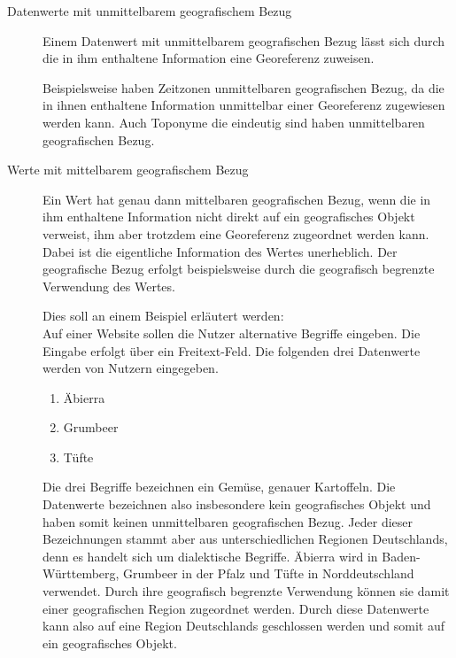 			\begin{description}
				\item[Datenwerte mit unmittelbarem geografischem Bezug]

					Einem Datenwert mit unmittelbarem geografischen Bezug lässt sich durch die in ihm enthaltene Information eine Georeferenz zuweisen.	

					Beispielsweise haben Zeitzonen unmittelbaren geografischen Bezug, da die in ihnen enthaltene Information unmittelbar einer Georeferenz zugewiesen werden kann.
					Auch Toponyme die eindeutig sind haben unmittelbaren geografischen Bezug.

				\item[Werte mit mittelbarem geografischem Bezug] 

					Ein Wert hat genau dann mittelbaren geografischen Bezug, wenn die in ihm enthaltene Information nicht direkt auf ein geografisches Objekt verweist, ihm aber trotzdem eine Georeferenz zugeordnet werden kann.
					Dabei ist die eigentliche Information des Wertes unerheblich. 
					Der geografische Bezug erfolgt beispielsweise durch die geografisch begrenzte Verwendung des Wertes. 

					Dies soll an einem Beispiel erläutert werden:\\
					Auf einer Website sollen die Nutzer alternative Begriffe eingeben.
					Die Eingabe erfolgt über ein Freitext-Feld. 
					Die folgenden drei Datenwerte werden von Nutzern eingegeben.

					\begin{enumerate}
					 	\item Äbierra
					 	\item Grumbeer
					 	\item Tüfte 
					 \end{enumerate} 

					Die drei Begriffe bezeichnen ein Gemüse, genauer Kartoffeln.
					Die Datenwerte bezeichnen also insbesondere kein geografisches Objekt und haben somit keinen unmittelbaren geografischen Bezug.
					Jeder dieser Bezeichnungen stammt aber aus unterschiedlichen Regionen Deutschlands, denn es handelt sich um dialektische Begriffe.
					Äbierra wird in Baden-Württemberg, Grumbeer in der Pfalz und Tüfte in Norddeutschland verwendet.
					Durch ihre geografisch begrenzte Verwendung können sie damit einer geografischen Region zugeordnet werden.
					Durch diese Datenwerte kann also auf eine Region Deutschlands geschlossen werden und somit auf ein geografisches Objekt.

			\end{description}

